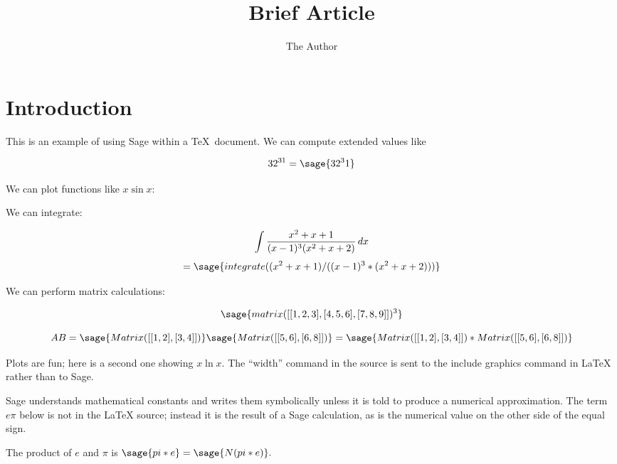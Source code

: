 \documentclass[11pt, oneside]{amsart}
\title{Brief Article}
\author{The Author}
\begin{document}
\maketitle
\section{Introduction}

This is an example of using Sage within a \TeX\ document. We can compute extended values like

  $$32^{31} = \sage{32^31}$$

We can plot functions like $x \sin x$:


We can integrate:

$$\int {{x^2 + x + 1}\over {(x - 1)^3 (x^2 + x + 2)}}\,dx$$ $$= \sage{integrate( (x^2 + x + 1) / ((x - 1)^3 * (x^2 + x + 2)) )}$$

\newpage
We can perform matrix calculations:

$$\sage{matrix([[1, 2, 3], [4, 5, 6], [7, 8, 9]])^3}$$

$$AB= \sage{Matrix([[1, 2], [3, 4]])} \sage{Matrix([[5, 6], [6, 8]])} = \sage{Matrix([[1, 2], [3, 4]]) * Matrix([[5, 6], [6, 8]])}$$

Plots are fun; here is a second one showing $x \ln x$. The ``width'' command in the source is sent to the include graphics command in LaTeX rather than to Sage.


Sage understands mathematical constants and writes them symbolically unless it is told to produce a numerical approximation. The term $e \pi$ below is not in the LaTeX source; instead it is the result of a Sage calculation, as is the numerical value on the other side of the equal sign.

The product of $e$ and $\pi$ is $\sage{pi * e} = \sage{N(pi * e)}.$
\end{document}
